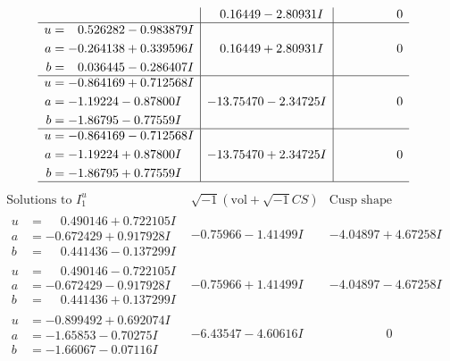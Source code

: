 \documentclass[1p]{elsarticle_modified}
\theoremstyle{definition}
\newcommand{\I}{\sqrt{-1}}
\begin{document}
$$\begin{array}{c|c|c}
 & \phantom{-}0.16449 - 2.80931 I & \phantom{-0.000000 } 0 \\ \hline\begin{aligned}
u &= \phantom{-}0.526282 - 0.983879 I \\
a &= -0.264138 + 0.339596 I \\
b &= \phantom{-}0.036445 - 0.286407 I\end{aligned}
 & \phantom{-}0.16449 + 2.80931 I & \phantom{-0.000000 } 0 \\ \hline\begin{aligned}
u &= -0.864169 + 0.712568 I \\
a &= -1.19224 - 0.87800 I \\
b &= -1.86795 - 0.77559 I\end{aligned}
 & -13.75470 - 2.34725 I & \phantom{-0.000000 } 0 \\ \hline\begin{aligned}
u &= -0.864169 - 0.712568 I \\
a &= -1.19224 + 0.87800 I \\
b &= -1.86795 + 0.77559 I\end{aligned}
 & -13.75470 + 2.34725 I & \phantom{-0.000000 } 0\\
 \hline 
 \end{array}$$\newpage$$\begin{array}{c|c|c}  
\text{Solutions to }I^u_{1}& \I (\text{vol} + \sqrt{-1}CS) & \text{Cusp shape}\\
 \hline 
\begin{aligned}
u &= \phantom{-}0.490146 + 0.722105 I \\
a &= -0.672429 + 0.917928 I \\
b &= \phantom{-}0.441436 - 0.137299 I\end{aligned}
 & -0.75966 - 1.41499 I & -4.04897 + 4.67258 I \\ \hline\begin{aligned}
u &= \phantom{-}0.490146 - 0.722105 I \\
a &= -0.672429 - 0.917928 I \\
b &= \phantom{-}0.441436 + 0.137299 I\end{aligned}
 & -0.75966 + 1.41499 I & -4.04897 - 4.67258 I \\ \hline\begin{aligned}
u &= -0.899492 + 0.692074 I \\
a &= -1.65853 - 0.70275 I \\
b &= -1.66067 - 0.07116 I\end{aligned}
 & -6.43547 - 4.60616 I & \phantom{-0.000000 } 0 \\ \hline\begin{aligned}

\end{aligned}
\end{array}$$
\end{document}
